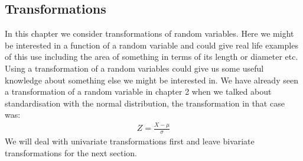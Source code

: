 \documentclass[,oneside]{article}
\begin{document}
\begin{enumerate}
\section{Transformations}
In this chapter we consider transformations of random variables. Here we might be interested in a function of a random variable and could give real life examples of this use including the area of something in terms of its length or diameter etc. Using a transformation of a random variables could give us some useful knowledge about something else we might be interested in. We have already seen a transformation of a random variable in chapter 2 when we talked about standardisation with the normal distribution, the transformation in that case was:
\begin{align*}
Z = \frac{X-\mu}{\sigma}
\end{align*}
We will deal with univariate transformations first and leave bivariate transformations for the next section.

\end{enumerate}
\end{document}
